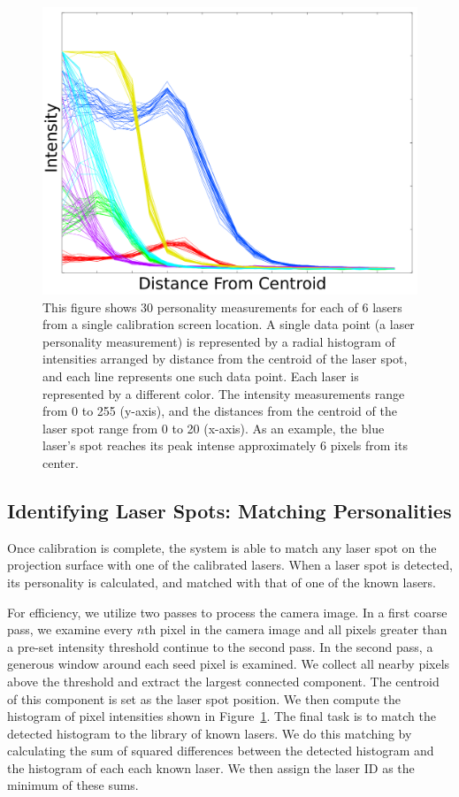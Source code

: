 \documentclass[review]{vgtc}                 %
\begin{document}
\begin{figure}
\includegraphics[width=0.99\linewidth]{images/AllLaserPersonalities_OneSpot.png}

\vspace{-0.1in}
\caption{\label{figure:six_laser_personalities} This figure shows 30
  personality measurements for each of 6 lasers from a single
  calibration screen location. A single data point (a laser
  personality measurement) is represented by a radial histogram of
  intensities arranged by distance from the centroid of the laser
  spot, and each line represents one such data point. Each laser is
  represented by a different color. The intensity measurements range
  from 0 to 255 (y-axis), and the distances from the centroid of the
  laser spot range from 0 to 20 (x-axis). As an example, the blue
  laser's spot reaches its peak intense approximately 6 pixels from
  its center.
}
\end{figure}


\subsection{Identifying Laser Spots: Matching Personalities}

Once calibration is complete, the system is able to match any laser
spot on the projection surface with one of the calibrated lasers.
When a laser spot is detected, its personality is calculated, and
matched with that of one of the known lasers.

For efficiency, we utilize two passes to process the camera image.  In
a first coarse pass, we examine every $n$th pixel in the camera image
and all pixels greater than a pre-set intensity threshold continue to
the second pass.  In the second pass, a generous window around each
seed pixel is examined.  We collect all nearby pixels above the
threshold and extract the largest connected component.  The centroid
of this component is set as the laser spot position.  We then compute
the histogram of pixel intensities shown in
Figure~\ref{figure:six_laser_personalities}.  The final task is to
match the detected histogram to the library of known lasers.  We do
this matching by calculating the sum of squared differences between
the detected histogram and the histogram of each each known laser.  We
then assign the laser ID as the minimum of these sums.  
\end{document}
